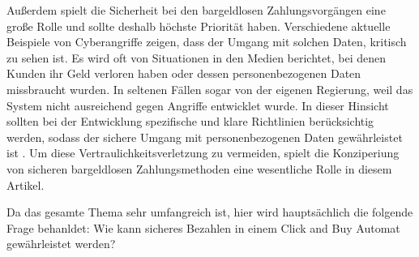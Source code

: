 Außerdem spielt die Sicherheit bei den bargeldlosen Zahlungsvorgängen eine große Rolle und sollte
deshalb höchste Priorität haben. Verschiedene aktuelle Beispiele von Cyberangriffe zeigen, dass der 
Umgang mit solchen Daten, kritisch zu sehen ist. Es wird oft von Situationen in den Medien berichtet,
bei denen Kunden ihr Geld verloren haben oder dessen personenbezogenen Daten missbraucht wurden. 
In seltenen Fällen sogar von der eigenen Regierung, weil das System nicht ausreichend gegen Angriffe entwicklet wurde.
In dieser Hinsicht sollten bei der Entwicklung spezifische und klare Richtlinien berücksichtig werden,
sodass der sichere Umgang mit personenbezogenen Daten gewährleistet ist \cite{refart:TRVR}. Um diese 
Vertraulichkeitsverletzung zu vermeiden, spielt die Konziperiung von sicheren bargeldlosen Zahlungsmethoden 
eine wesentliche Rolle in diesem Artikel. 

Da das gesamte Thema sehr umfangreich ist, hier wird hauptsächlich die folgende Frage behanldet: 
Wie kann sicheres Bezahlen in einem Click and Buy Automat gewährleistet werden?